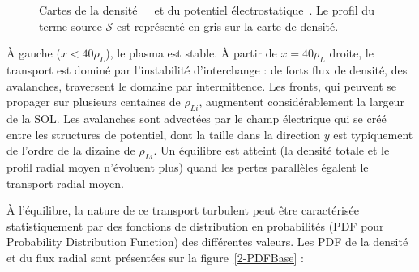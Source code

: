 \begin{refsection}
\begin{figure}[!htbp]
    \centering
    \caption{Cartes de la densité~~~et du potentiel
    électrostatique~. Le profil du terme source
    $\mathcal{S}$ est représenté en gris sur la carte de densité.
    }
    \label{2-CartesBase}
\end{figure}

À gauche ($x<40 \rho_L$), le plasma est stable. À partir de $x=40 \rho_L$
droite, le transport est dominé par l'instabilité d'interchange : de forts flux de densité, des avalanches, traversent le domaine par intermittence.
Les fronts, qui peuvent se propager sur plusieurs centaines de
$\rho_{Li}$, augmentent considérablement la largeur de la SOL.
Les avalanches sont advectées par le champ électrique qui se créé entre les
structures de potentiel, dont la taille dans la direction $y$ est
typiquement de l'ordre de la dizaine de $\rho_{Li}$.
Un équilibre est atteint (la densité totale et le profil radial moyen
n'évoluent plus) quand les pertes parallèles égalent le transport radial moyen.

À l'équilibre, la nature de ce transport turbulent peut être
caractérisée statistiquement par des fonctions de distribution en probabilités
(PDF pour Probability Distribution Function) des différentes valeurs. Les PDF
de la densité et du flux radial sont présentées sur la figure~\ref{2-PDFBase} : 


\end{refsection}
